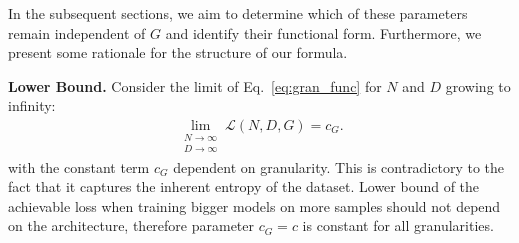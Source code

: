 In the subsequent sections, we aim to determine which of these parameters remain independent of $G$ and identify their functional form. Furthermore, we present some rationale for the structure of our formula.


\textbf{Lower Bound.}
Consider the limit of Eq.~\ref{eq:gran_func} for $N$ and $D$ growing to infinity:
\begin{align}\label{eq:gran_limit}
\lim_{\substack{N\to \infty\\ D\to \infty}}    \mathcal{L}(N, D, G) = c_G.
\end{align}
 with the constant term $c_G$ dependent on granularity. This is contradictory to the fact that it captures the inherent entropy of the dataset. Lower bound of the achievable loss when training bigger models on more samples should not depend on the architecture, therefore parameter $c_G=c$ is constant for all granularities. 
